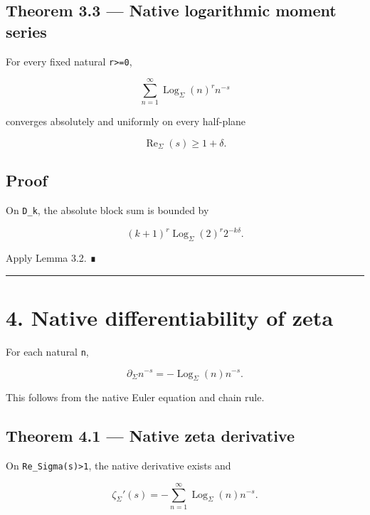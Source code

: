 \hypertarget{theorem-3.3-native-logarithmic-moment-series}{%
\subsection{Theorem 3.3 --- Native logarithmic moment series}\label{theorem-3.3-native-logarithmic-moment-series}}

For every fixed natural \texttt{r\textgreater{}=0},

\[
\sum_{n=1}^{\infty}
\operatorname{Log}_\Sigma(n)^r n^{-s}
\]

converges absolutely and uniformly on every half-plane

\[
\operatorname{Re}_\Sigma(s)\ge1+\delta.
\]

\hypertarget{proof-6}{%
\subsection{Proof}\label{proof-6}}

On \texttt{D\_k}, the absolute block sum is bounded by

\[
(k+1)^r
\operatorname{Log}_\Sigma(2)^r
2^{-k\delta}.
\]

Apply Lemma 3.2. ∎

\begin{center}\rule{0.5\linewidth}{0.5pt}\end{center}

\hypertarget{native-differentiability-of-zeta}{%
\section{4. Native differentiability of zeta}\label{native-differentiability-of-zeta}}

For each natural \texttt{n},

\[
\partial_\Sigma n^{-s}
=-\operatorname{Log}_\Sigma(n)n^{-s}.
\]

This follows from the native Euler equation and chain rule.

\hypertarget{theorem-4.1-native-zeta-derivative}{%
\subsection{Theorem 4.1 --- Native zeta derivative}\label{theorem-4.1-native-zeta-derivative}}

On \texttt{Re\_Sigma(s)\textgreater{}1}, the native derivative exists and

\[
\boxed{
\zeta_\Sigma'(s)
=-
\sum_{n=1}^{\infty}
\operatorname{Log}_\Sigma(n)n^{-s}.
}
\]

